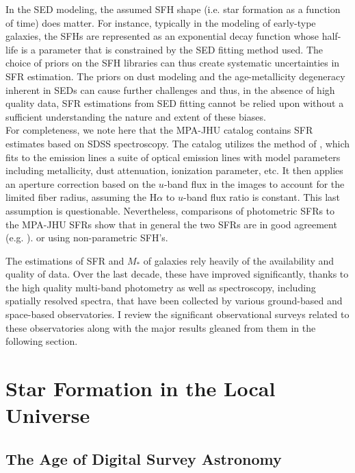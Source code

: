 In the SED modeling, the assumed SFH shape (i.e. star formation as a
function of time) does matter. For instance, typically in the modeling
of early-type galaxies, the SFHs are represented as an exponential
decay function whose half-life is a parameter that is constrained by
the SED fitting method used. The choice of priors on the SFH libraries
can thus create systematic uncertainties in SFR estimation. The priors
on dust modeling and the age-metallicity degeneracy inherent in SEDs
can cause further challenges and thus, in the absence of high quality
data, SFR estimations from SED fitting cannot be relied upon without a
sufficient understanding the nature and extent of these biases.\\

For completeness, we note here that the MPA-JHU catalog contains SFR
estimates based on SDSS spectroscopy. The catalog utilizes the method
of \citet{brinchmann_physical_2004}, which fits to the emission lines
a suite of optical emission lines with model parameters including
metallicity, dust attenuation, ionization parameter, etc. It then
applies an aperture correction based on the $u$-band flux in the
images to account for the limited fiber radius, assuming the H$\alpha$
to $u$-band flux ratio is constant. This last assumption is
questionable. Nevertheless, comparisons of photometric SFRs to 
the MPA-JHU SFRs show that in general the two SFRs are in good
agreement (e.g. \citealt{salim_uv_2007}).
or using non-parametric SFH's.

The estimations of SFR and $M_{*}$ of galaxies rely heavily of the
availability and quality of data. Over the last decade, these have
improved significantly, thanks to the high quality multi-band
photometry as well as spectroscopy, including spatially resolved
spectra, that have been collected by various ground-based and
space-based observatories. I review the significant observational
surveys related to these observatories along with the major results
gleaned from them in the following section.\\

\section{Star Formation in the Local Universe}

\subsection{The Age of Digital Survey Astronomy}

